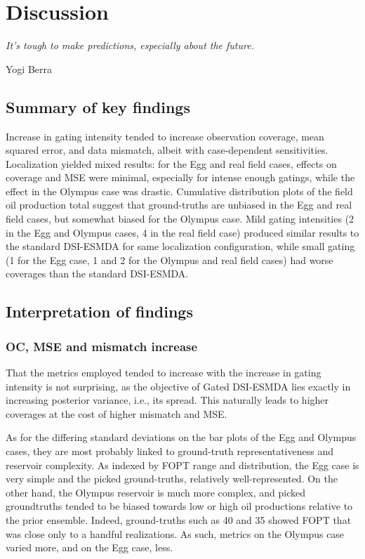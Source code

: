 \chapter{Discussion}
\label{chap:discussion}

\setlength{\epigraphwidth}{0.6\textwidth}
\epigraph{%
    \vspace*{-1cm}
    \itshape%
    It's tough to make predictions, especially about the future.
}{Yogi Berra}

\section{Summary of key findings}

Increase in gating intensity tended to increase 
observation coverage, mean squared error, and data mismatch,
albeit with case-dependent sensitivities.
%
Localization yielded mixed results: for the Egg and real field cases,
effects on coverage and MSE were minimal, especially for intense enough gatings,
while the effect in the Olympus case was drastic.
%
Cumulative distribution plots of the field oil production total suggest 
that ground-truths are unbiased in the Egg and real field cases,
but somewhat biased for the Olympus case.
%
Mild gating intensities (2 in the Egg and Olympus cases, 4 in the real field case) produced similar results 
to the standard DSI-ESMDA for same localization configuration,
while small gating (1 for the Egg case, 1 and 2 for the Olympus and real field cases)
had worse coverages than the standard DSI-ESMDA.
 
\section{Interpretation of findings}

\subsection{OC, MSE and mismatch increase}
That the metrics employed tended to increase with the increase in gating intensity is not surprising,
as the objective of Gated DSI-ESMDA lies exactly in increasing posterior variance,
i.e., its spread.
%
This naturally leads to higher coverages at the cost of higher mismatch and MSE. 

As for the differing standard deviations on the bar plots of the Egg and Olympus cases,
they are most probably linked to ground-truth representativeness and reservoir complexity.
As indexed by FOPT range and distribution, 
the Egg case is very simple and the picked ground-truths, relatively well-represented.
On the other hand, the Olympus reservoir is much more complex, 
and picked groundtruths tended to be biased towards low or high oil productions relative to the prior ensemble.
Indeed, ground-truths such as 40 and 35 showed FOPT that was close only to a handful realizations.
As such, metrics on the Olympus case varied more, and on the Egg case, less. 

